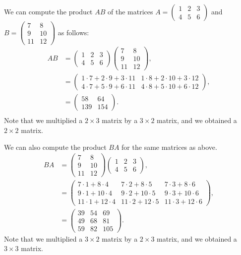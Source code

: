 \documentclass{ximera}
\begin{document}
\begin{example}
We can compute the product $AB$ of the matrices $A = \left(\begin{array}{ccc}1&2&3\\4&5&6\end{array}\right)$ and $B=\left(\begin{array}{cc}7&8\\9&10\\11&12\end{array}\right)$ as follows:
\begin{align*}
AB &= \left(\begin{array}{ccc}1&2&3\\4&5&6\end{array}\right)\left(\begin{array}{cc}7&8\\9&10\\11&12\end{array}\right),\\
&= \left(\begin{array}{cc}1\cdot 7+ 2\cdot 9 + 3\cdot 11 & 1\cdot 8+ 2\cdot 10 + 3\cdot 12\\
4\cdot 7+ 5\cdot 9 + 6\cdot 11 & 4\cdot 8+ 5\cdot 10 + 6\cdot 12\end{array}\right),\\
&= \left(\begin{array}{cc}58 & 64\\
139 & 154\end{array}\right).\\
\end{align*}
Note that we multiplied a $2\times 3$ matrix by a $3\times 2$ matrix, and we obtained a $2\times 2$ matrix.

We can also compute the product $BA$ for the same matrices as above.
\begin{align*}
BA &= \left(\begin{array}{cc}7&8\\9&10\\11&12\end{array}\right)\left(\begin{array}{ccc}1&2&3\\4&5&6\end{array}\right),\\
&= \left(\begin{array}{ccc}7\cdot 1 + 8\cdot 4 & 7\cdot 2 + 8\cdot 5 & 7\cdot 3 + 8\cdot 6\\
9\cdot 1 + 10\cdot 4 & 9\cdot 2 + 10\cdot 5 & 9\cdot 3 + 10\cdot 6\\
11\cdot 1 + 12\cdot 4 & 11\cdot 2 + 12\cdot 5 & 11\cdot 3 + 12\cdot 6\end{array}\right),\\
&= \left(\begin{array}{ccc}39 & 54 & 69\\
49 & 68 & 81\\
59 & 82 & 105\end{array}\right).
\end{align*}
Note that we multiplied a $3\times 2$ matrix by a $2\times 3$ matrix, and we obtained a $3\times 3$ matrix.


\end{example}
\end{document}
